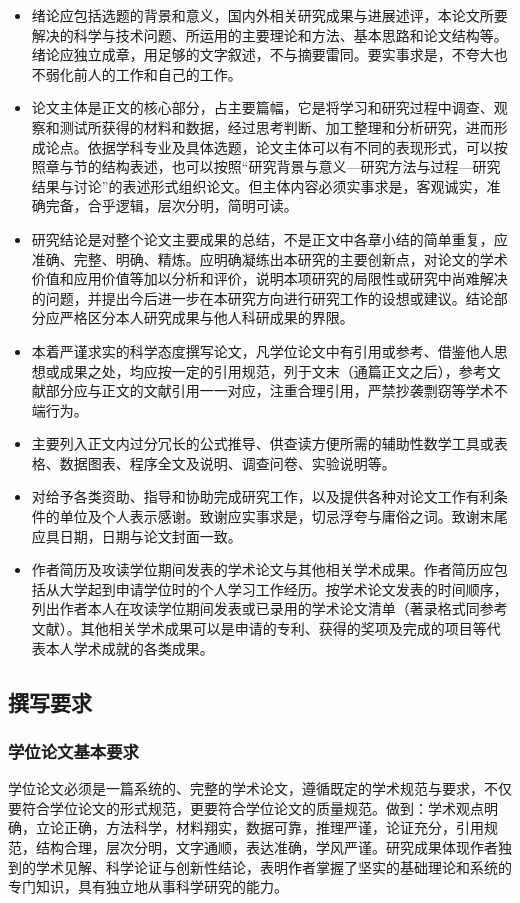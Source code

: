 \begin{itemize}
    \item 绪论应包括选题的背景和意义，国内外相关研究成果与进展述评，本论文所要解决的科学与技术问题、所运用的主要理论和方法、基本思路和论文结构等。绪论应独立成章，用足够的文字叙述，不与摘要雷同。要实事求是，不夸大也不弱化前人的工作和自己的工作。
    \item 论文主体是正文的核心部分，占主要篇幅，它是将学习和研究过程中调查、观察和测试所获得的材料和数据，经过思考判断、加工整理和分析研究，进而形成论点。依据学科专业及具体选题，论文主体可以有不同的表现形式，可以按照章与节的结构表述，也可以按照“研究背景与意义—研究方法与过程—研究结果与讨论”的表述形式组织论文。但主体内容必须实事求是，客观诚实，准确完备，合乎逻辑，层次分明，简明可读。
    \item 研究结论是对整个论文主要成果的总结，不是正文中各章小结的简单重复，应准确、完整、明确、精炼。应明确凝练出本研究的主要创新点，对论文的学术价值和应用价值等加以分析和评价，说明本项研究的局限性或研究中尚难解决的问题，并提出今后进一步在本研究方向进行研究工作的设想或建议。结论部分应严格区分本人研究成果与他人科研成果的界限。
    \item 本着严谨求实的科学态度撰写论文，凡学位论文中有引用或参考、借鉴他人思想或成果之处，均应按一定的引用规范，列于文末（通篇正文之后），参考文献部分应与正文的文献引用一一对应，注重合理引用，严禁抄袭剽窃等学术不端行为。
    \item 主要列入正文内过分冗长的公式推导、供查读方便所需的辅助性数学工具或表格、数据图表、程序全文及说明、调查问卷、实验说明等。
    \item 对给予各类资助、指导和协助完成研究工作，以及提供各种对论文工作有利条件的单位及个人表示感谢。致谢应实事求是，切忌浮夸与庸俗之词。致谢末尾应具日期，日期与论文封面一致。
    \item 作者简历及攻读学位期间发表的学术论文与其他相关学术成果。作者简历应包括从大学起到申请学位时的个人学习工作经历。按学术论文发表的时间顺序，列出作者本人在攻读学位期间发表或已录用的学术论文清单（著录格式同参考文献）。其他相关学术成果可以是申请的专利、获得的奖项及完成的项目等代表本人学术成就的各类成果。
    
\end{itemize}

\subsection{撰写要求}

\subsubsection{学位论文基本要求}
学位论文必须是一篇系统的、完整的学术论文，遵循既定的学术规范与要求，不仅要符合学位论文的形式规范，更要符合学位论文的质量规范。做到：学术观点明确，立论正确，方法科学，材料翔实，数据可靠，推理严谨，论证充分，引用规范，结构合理，层次分明，文字通顺，表达准确，学风严谨。研究成果体现作者独到的学术见解、科学论证与创新性结论，表明作者掌握了坚实的基础理论和系统的专门知识，具有独立地从事科学研究的能力。

